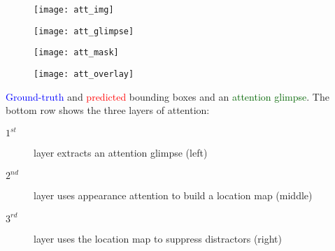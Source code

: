 
\vspace{2\baselineskip}


    \begin{minipage}[c]{0.3\textwidth}
        \centering
        \begin{subfigure}[b]{1.\textwidth}
            \texttt{[image: att\_img]}
        \end{subfigure}
        
        \hspace{-30pt}
        \begin{minipage}{.85\textwidth}
            \vspace{.5em}
            \begin{subfigure}[b]{.29\textwidth}
                \texttt{[image: att\_glimpse]}
            \end{subfigure}
            \hfill
            \hspace{8pt}
            \begin{subfigure}[b]{.29\textwidth}
                \texttt{[image: att\_mask]}
            \end{subfigure}
            \hfill
            \hspace{5pt}
            \begin{subfigure}[b]{.29\textwidth}
                \texttt{[image: att\_overlay]}
            \end{subfigure}
            
        \end{minipage}
    \end{minipage}\hfill
 
    \begin{minipage}[c]{0.3\textwidth}
        \vspace{1em}
            \textcolor{blue}{Ground-truth} and \textcolor{red}{predicted} bounding boxes and an \textcolor{darkgreen}{attention glimpse}. The bottom row shows the three layers of attention: 
            \begin{description}%
                \item [$1^{st}$]  layer extracts an attention glimpse (left)
                \item [$2^{nd}$]  layer uses appearance attention to build a location map (middle)
                \item [$3^{rd}$]  layer uses the location map to suppress distractors (right)
            \end{description}
    \end{minipage}